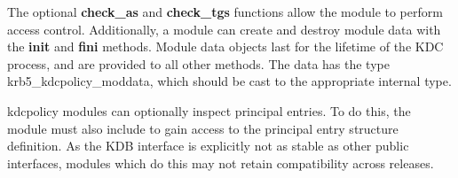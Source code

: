 \documentclass[letterpaper,10pt,english]{sphinxmanual}
\begin{document}
The optional \textbf{check\_as} and \textbf{check\_tgs} functions allow the module
to perform access control.  Additionally, a module can create and
destroy module data with the \textbf{init} and \textbf{fini} methods.  Module
data objects last for the lifetime of the KDC process, and are
provided to all other methods.  The data has the type
krb5\_kdcpolicy\_moddata, which should be cast to the appropriate
internal type.

kdcpolicy modules can optionally inspect principal entries.  To do
this, the module must also include  to gain access to the
principal entry structure definition.  As the KDB interface is
explicitly not as stable as other public interfaces, modules which do
this may not retain compatibility across releases.



\renewcommand{\indexname}{Index}
\printindex
\end{document}
